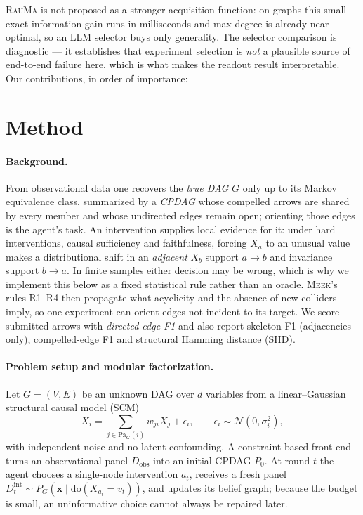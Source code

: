 \documentclass{article}
\newcommand{\rauma}{\textsc{RauMa}}
\newcommand{\meek}{\textsc{Meek}}
\newcommand{\Dobs}{D_{\mathrm{obs}}}
\newcommand{\Dint}[1]{D^{\mathrm{int}}_{#1}}
\begin{document}
\rauma{} is not proposed as a stronger acquisition function: on graphs this small exact
information gain runs in milliseconds and max-degree is already near-optimal, so an LLM selector
buys only generality. The selector comparison is diagnostic --- it establishes that experiment
selection is \emph{not} a plausible source of end-to-end failure here, which is what makes the
readout result interpretable. Our contributions, in order of importance:

\section{Method}
\label{sec:method}

\paragraph{Background.}
\label{sec:prelim}
From observational data one recovers the \emph{true DAG} $G$ only up to its Markov equivalence
class, summarized by a \emph{CPDAG} whose compelled arrows are shared by every member and whose
undirected edges remain open; orienting those edges is the agent's task. An intervention
supplies local evidence for it: under hard interventions, causal sufficiency and faithfulness,
forcing $X_a$ to an unusual value makes a distributional shift in an \emph{adjacent} $X_b$
support $a \to b$ and invariance support $b \to a$. In finite samples either decision may be
wrong, which is why we implement this below as a fixed statistical rule rather than an oracle.
\meek's rules R1--R4 then propagate what acyclicity and the absence of new colliders imply, so
one experiment can orient edges not incident to its target. We score submitted arrows with
\emph{directed-edge F1} and also report skeleton F1 (adjacencies only), compelled-edge F1 and
structural Hamming distance (SHD).

\paragraph{Problem setup and modular factorization.}
Let $G=(V,E)$ be an unknown DAG over $d$ variables from a linear--Gaussian structural causal
model (SCM)
\begin{equation}
X_i = \sum_{j \in \mathrm{Pa}_G(i)} w_{ji} X_j + \epsilon_i,
\qquad \epsilon_i \sim \mathcal{N}(0, \sigma_i^2),
\end{equation}
with independent noise and no latent confounding. A constraint-based front-end turns an
observational panel $\Dobs$ into an initial CPDAG $P_0$. At round $t$ the agent chooses a
single-node intervention $a_t$, receives a fresh panel $\Dint{t} \sim P_G(\boldsymbol{x} \mid
\mathrm{do}(X_{a_t}=v_t))$, and updates its belief graph; because the budget is small, an
uninformative choice cannot always be repaired later.
\end{document}
